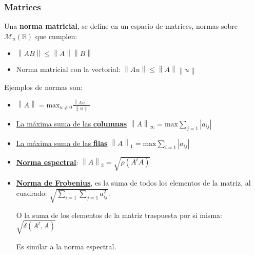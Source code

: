 \subsubsection{Matrices}
Una \textbf{norma matricial}, se define en un espacio de matrices, normas sobre \(\mathcal{M}_n(\mathbb{R})\) que cumplen:
\begin{itemize}
        \item \(\left \| AB \right \| \leq  \left \|  A\right \|\left \|  B\right \|\)
        \item Norma matricial con la vectorial: \(\left \| Au \right \| \leq \left \| A \right \| \left \| u \right \|\)
\end{itemize}
Ejemplos de normas son:
\begin{itemize}
        \item \(\left \| A \right \| = \text{max}_{u \neq 0} \frac{\left \| Au \right \|}{\left \| u \right \|}\)
        \item \underline{La máxima suma de las \textbf{columnas}} \(\left \| A \right \|_\infty = \text{max} \sum_{j=1} \left | a_{ij} \right |\)
        \item \underline{La máxima suma de las \textbf{filas}} \(\left \| A \right \|_1 = \text{max} \sum_{i=1} \left | a_{ij} \right |\)
        \item \textbf{\underline{Norma espectral}}: \(\left \| A \right \|_2 = \sqrt{\rho(A^tA)}\)
        \item \textbf{\underline{Norma de Frobenius}}, es la suma de todos los elementos de la matriz, al cuadrado: \(\sqrt{\sum_{i=1}\sum_{j=1} a_{ij}^2}\).\par O la suma de los elementos de la matriz traspuesta por si misma: \(\sqrt{\delta(A^t,A)}\) \par Es similar a la norma espectral.
\end{itemize}

